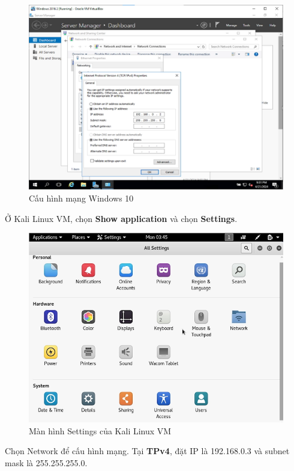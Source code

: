 \begin{figure}[!htb]
    \centering
    \includegraphics[width=0.85\linewidth]{figure//chapter5//lab5_2/windows10_network.png}
    \caption{Cấu hình mạng Windows 10}
    \label{fig:enter-label}
\end{figure}

 Ở Kali Linux VM, chọn \textbf{Show application} và chọn \textbf{Settings}.

\begin{figure}[!htb]
    \centering
    \includegraphics[width=0.85\linewidth]{figure//chapter5//lab5_2/setting-linux.png}
    \caption{Màn hình Settings của Kali Linux VM}
    \label{fig:enter-label}
\end{figure}

 Chọn Network để cấu hình mạng. Tại \textbf{TPv4}, đặt IP là 192.168.0.3 và subnet mask là 255.255.255.0.

